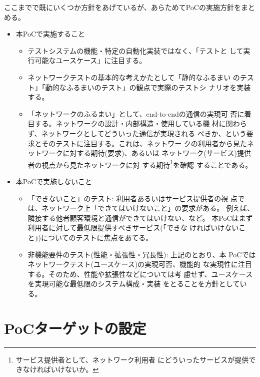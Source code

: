 ここまでで既にいくつか方針をあげているが、あらためてPoCの実施方針をまとめる。
\begin{itemize}
 \item 本PoCで実施すること
       \begin{itemize}
        \item テストシステムの機能・特定の自動化実装ではなく、「テストと
              して実行可能なユースケース」に注目する。
        \item ネットワークテストの基本的な考えかたとして「静的なふるまい
              のテスト」「動的なふるまいのテスト」の観点で実際のテストシ
              ナリオを実装する。
        \item 「ネットワークのふるまい」として、end-to-endの通信の実現可
              否に着目する。ネットワークの設計・内部構造・使用している機
              材に関わらず、ネットワークとしてどういった通信が実現される
              べきか、という要求とそのテストに注目する。これは、ネットワー
              クの利用者から見たネットワークに対する期待(要求)、あるいは
              ネットワーク(サービス)提供者の視点から見たネットワークに対
              する期待\footnote{サービス提供者として、ネットワーク利用者
              にどういったサービスが提供できなければいけないか。}を確認
              することである。
       \end{itemize}
 \item 本PoCで実施しないこと
       \begin{itemize}
        \item 「できないこと」のテスト: 利用者あるいはサービス提供者の視
              点では、ネットワーク上「できてはいけないこと」の要求がある。
              例えば、隣接する他者顧客環境と通信ができてはいけない、など。
              本PoCはまず利用者に対して最低限提供すべきサービス(「できな
              ければいけないこと」)についてのテストに焦点をあてる。
        \item 非機能要件のテスト(性能・拡張性・冗長性): 上記のとおり、本
              PoCではネットワークテスト(ユースケース)の実現可否、機能的
              な実現性に注目する。そのため、性能や拡張性などについては考
              慮せず、ユースケースを実現可能な最低限のシステム構成・実装
              をとることを方針としている。
       \end{itemize}
\end{itemize}

 \section{PoCターゲットの設定}

